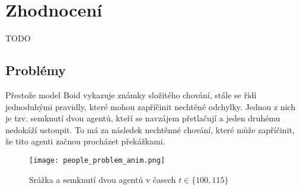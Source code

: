 \section{Zhodnocení}
TODO

\subsection{Problémy}
Přestože model Boid vykazuje známky složitého chování, stále se řídí jednoduhými pravidly, které mohou zapříčinit nechtěné odchylky. Jednou z nich je tzv. semknutí dvou agentů, kteří se navzájem přetlačují a jeden druhému nedokáží ustoupit. To má za následek nechtěnné chování, které může zapříčinit, že tito agenti začnou procházet překážkami. 
\begin{figure}[H]
	\texttt{[image: people\_problem\_anim.png]}
	\centering
	\caption{Srážka a semknutí dvou agentů v časech $t\in\{ 100, 115\} $}
\end{figure}


